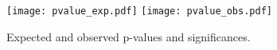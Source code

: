 \begin{figure}[htbp]
\begin{center}
\texttt{[image: pvalue\_exp.pdf]} 
\texttt{[image: pvalue\_obs.pdf]}  
\caption{Expected and observed p-values and significances.} 
\end{center} 
\end{figure} 

